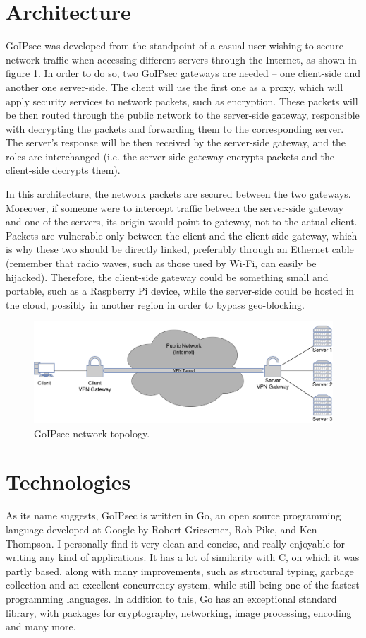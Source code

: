 \documentclass[a4paper,12pt]{report}
\begin{document}
		\section{Architecture}
		GoIPsec was developed from the standpoint of a casual user wishing to secure network traffic when accessing different servers through the Internet, as shown in figure \ref{topology}. In order to do so, two GoIPsec gateways are needed -- one client-side and another one server-side. The client will use the first one as a proxy, which will apply security services to network packets, such as encryption. These packets will be then routed through the public network to the server-side gateway, responsible with decrypting the packets and forwarding them to the corresponding server. The server's response will be then received by the server-side gateway, and the roles are interchanged (i.e. the server-side gateway encrypts packets and the client-side decrypts them).
		
		In this architecture, the network packets are secured between the two gateways. Moreover, if someone were to intercept traffic between the server-side gateway and one of the servers, its origin would point to gateway, not to the actual client. Packets are vulnerable only between the client and the client-side gateway, which is why these two should be directly linked, preferably through an Ethernet cable (remember that radio waves, such as those used by Wi-Fi, can easily be hijacked). Therefore, the client-side gateway could be something small and portable, such as a Raspberry Pi device, while the server-side could be hosted in the cloud, possibly in another region in order to bypass geo-blocking.
		\begin{figure}[h]
			\includegraphics[width=\textwidth]{goipsec_setup}
			\centering
			\caption{GoIPsec network topology.}
			\label{topology}
		\end{figure}
		
		\section{Technologies}
		As its name suggests, GoIPsec is written in Go, an open source programming language developed at Google by Robert Griesemer, Rob Pike, and Ken Thompson. I personally find it very clean and concise, and really enjoyable for writing any kind of applications. It has a lot of similarity with C, on which it was partly based, along with many improvements, such as structural typing, garbage collection and an excellent concurrency system, while still being one of the fastest programming languages. In addition to this, Go has an exceptional standard library, with packages for cryptography, networking, image processing, encoding and many more.
		
\end{document}
